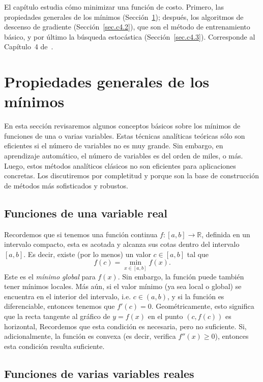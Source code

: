 \documentclass[12pt, a4paper]{amsbook}
\newcommand{\R}{{\mathbb R}}
\theoremstyle{remark}
\theoremstyle{definition}
\numberwithin{section}{chapter}
\numberwithin{subsection}{section}
\numberwithin{equation}{section}
\numberwithin{figure}{chapter}
\begin{document}
El capítulo estudia cómo minimizar una función de costo. Primero, las propiedades generales de los mínimos (Sección~\ref{sec.c4.1}); después, los algoritmos de descenso de gradiente (Sección~\ref{sec.c4.2}), que son el método de entrenamiento básico, y por último la búsqueda estocástica (Sección~\ref{sec.c4.3}). Corresponde al Capítulo~4 de~\cite{Calin}.

\section{Propiedades generales de los mínimos}\label{sec.c4.1}

En esta sección revisaremos algunos conceptos básicos sobre los mínimos de funciones de una o varias variables. Estas técnicas analíticas teóricas sólo son eficientes si el número de variables no es muy grande. Sin embargo, en aprendizaje automático, el número de variables es del orden de miles, o más. Luego, estos métodos analíticos clásicos no son eficientes para aplicaciones concretas. Los discutiremos por completitud y porque son la base de construcción de métodos más sofisticados y robustos.

\subsection{Funciones de una variable real}

Recordemos que si tenemos una función continua $f\colon [a, b]\to \R$, definida en un intervalo compacto, esta es acotada y alcanza sus cotas dentro del intervalo $[a, b]$. Es decir, existe (por lo menos) un valor $c\in [a, b]$ tal que 
$$
f(c) = \min_{x\in [a, b]} f(x).
$$
Este es el {\em mínimo global} para $f(x)$. Sin embargo, la función puede también tener mínimos locales. Más aún, si el valor mínimo (ya sea local o global) se encuentra en el interior del intervalo, i.e. $c\in (a, b)$, y si la función es diferenciable, entonces tenemos que $f'(c)=0$. Geométricamente, esto significa que la recta tangente al gráfico de $y=f(x)$ en el punto $(c, f(c))$ es horizontal, Recordemos que esta condición es necesaria, pero no suficiente. Si, adicionalmente, la función es convexa (es decir, verifica $f''(x)\ge 0$), entonces esta condición resulta suficiente.

\subsection{Funciones de varias variables reales}
\end{document}
